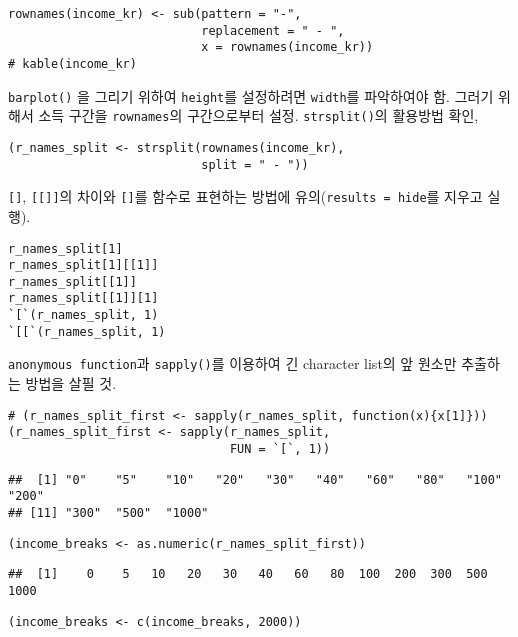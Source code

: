\documentclass[
]{article}
\begin{document}
\begin{verbatim}
rownames(income_kr) <- sub(pattern = "-", 
                           replacement = " - ", 
                           x = rownames(income_kr))
# kable(income_kr)
\end{verbatim}

\texttt{barplot()} 을 그리기 위하여 \texttt{height}를 설정하려면
\texttt{width}를 파악하여야 함. 그러기 위해서 소득 구간을
\texttt{rownames}의 구간으로부터 설정. \texttt{strsplit()}의 활용방법
확인,

\begin{verbatim}
(r_names_split <- strsplit(rownames(income_kr), 
                           split = " - "))
\end{verbatim}

\texttt{{[}{]}}, \texttt{{[}{[}{]}{]}}의 차이와 \texttt{{[}{]}}를 함수로
표현하는 방법에
유의(\texttt{results\ =\ \textquotesingle{}hide\textquotesingle{}}를
지우고 실행).

\begin{verbatim}
r_names_split[1]
r_names_split[1][[1]]
r_names_split[[1]]
r_names_split[[1]][1]
`[`(r_names_split, 1)
`[[`(r_names_split, 1)
\end{verbatim}

\texttt{anonymous\ function}과 \texttt{sapply()}를 이용하여 긴 character
list의 앞 원소만 추출하는 방법을 살필 것.

\begin{verbatim}
# (r_names_split_first <- sapply(r_names_split, function(x){x[1]}))
(r_names_split_first <- sapply(r_names_split, 
                               FUN = `[`, 1))
\end{verbatim}

\begin{verbatim}
##  [1] "0"    "5"    "10"   "20"   "30"   "40"   "60"   "80"   "100"  "200" 
## [11] "300"  "500"  "1000"
\end{verbatim}

\begin{verbatim}
(income_breaks <- as.numeric(r_names_split_first))
\end{verbatim}

\begin{verbatim}
##  [1]    0    5   10   20   30   40   60   80  100  200  300  500 1000
\end{verbatim}

\begin{verbatim}
(income_breaks <- c(income_breaks, 2000))
\end{verbatim}
\end{document}
